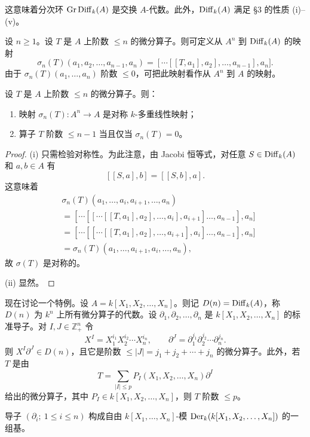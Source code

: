 这意味着分次环 $\operatorname{Gr}\operatorname{Diff}_k(A)$ 是交换 $A$-代数。此外，$\operatorname{Diff}_k(A)$ 满足 §3 的性质 (i)--(v)。

设 $n\ge 1$。设 $T$ 是 $A$ 上阶数 $\le n$ 的微分算子。则可定义从 $A^n$ 到 $\operatorname{Diff}_k(A)$ 的映射
$$\sigma_n(T)(a_1,a_2,\dots,a_{n-1},a_n)=[\cdots[[T,a_1],a_2],\dots,a_{n-1}],a_n].$$
由于 $\sigma_n(T)(a_1,\dots,a_n)$ 阶数 $\le 0$，可把此映射看作从 $A^n$ 到 $A$ 的映射。

\begin{lemma}
设 $T$ 是 $A$ 上阶数 $\le n$ 的微分算子。则：
\begin{enumerate}[label=(\roman*)]
  \item 映射 $\sigma_n(T):A^n\to A$ 是对称 $k$-多重线性映射；
  \item 算子 $T$ 阶数 $\le n-1$ 当且仅当 $\sigma_n(T)=0$。
\end{enumerate}
\end{lemma}

\begin{proof}
(i) 只需检验对称性。为此注意，由 Jacobi 恒等式，对任意 $S\in\operatorname{Diff}_k(A)$ 和 $a,b\in A$ 有
$$[[S,a],b]=[[S,b],a].$$
这意味着
\begin{align*}
&\sigma_n(T)(a_1,\dots,a_i,a_{i+1},\dots,a_n)\\
&=[\cdots[[\cdots[[T,a_1],a_2],\dots,a_i],a_{i+1}]\dots,a_{n-1}],a_n]\\
&=[\cdots[[\cdots[[T,a_1],a_2],\dots,a_{i+1}],a_i]\dots,a_{n-1}],a_n]\\
&=\sigma_n(T)(a_1,\dots,a_{i+1},a_i,\dots,a_n),
\end{align*}
故 $\sigma(T)$ 是对称的。

(ii) 显然。
\end{proof}

现在讨论一个特例。设 $A=k[X_1,X_2,\dots,X_n]$。则记 $D(n)=\operatorname{Diff}_k(A)$，称 $D(n)$ 为 $k^n$ 上所有微分算子的代数。设 $\partial_1,\partial_2,\dots,\partial_n$ 是 $k[X_1,X_2,\dots,X_n]$ 的标准导子。对 $I,J\in\mathbb{Z}_+^n$ 令
$$X^I=X_1^{i_1}X_2^{i_2}\cdots X_n^{i_n},\qquad \partial^J=\partial_1^{j_1}\partial_2^{j_2}\cdots\partial_n^{j_n}.$$
则 $X^I\partial^J\in D(n)$，且它是阶数 $\le |J|=j_1+j_2+\cdots+j_n$ 的微分算子。此外，若 $T$ 是由
$$T=\sum_{|I|\le p}P_I(X_1,X_2,\dots,X_n)\partial^I$$
给出的微分算子，其中 $P_I\in k[X_1,X_2,\dots,X_n]$，则 $T$ 阶数 $\le p$。

\begin{lemma}
导子 $(\partial_i;\ 1\le i\le n)$ 构成自由 $k[X_1,\dots,X_n]$-模 $\operatorname{Der}_k(k[X_1,X_2,\dots,X_n])$ 的一组基。
\end{lemma}

